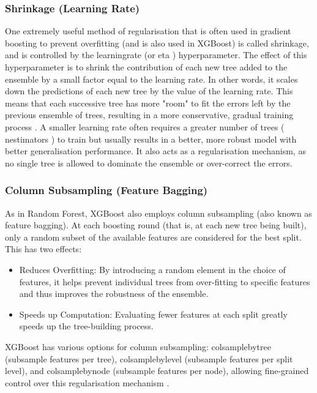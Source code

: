 \subsubsection{Shrinkage (Learning Rate)} 
One extremely useful method of regularisation that is often used in gradient boosting to prevent overfitting (and is also used in XGBoost) is called shrinkage, and is controlled by the learning\textunderscore rate (or eta ) hyperparameter. The effect of this hyperparameter is to shrink the contribution of each new tree added to the ensemble by a small factor equal to the learning rate. In other words, it scales down the predictions of each new tree by the value of the learning rate. This means that each successive tree has more "room" to fit the errors left by the previous ensemble of trees, resulting in a more conservative, gradual training process \parencite{aldhubaib2024network}. A smaller learning rate often requires a greater number of trees ( n\textunderscore estimators ) to train but usually results in a better, more robust model with better generalisation performance. It also acts as a regularisation mechanism, as no single tree is allowed to dominate the ensemble or over-correct the errors.

\subsubsection{Column Subsampling (Feature Bagging)} 
As in Random Forest, XGBoost also employs column subsampling (also known as feature bagging). At each boosting round (that is, at each new tree being built), only a random subset of the available features are considered for the best split. This has two effects: 
\begin{itemize}[noitemsep] 
\item Reduces Overfitting: By introducing a random element in the choice of features, it helps prevent individual trees from over-fitting to specific features and thus improves the robustness of the ensemble.
\item Speeds up Computation: Evaluating fewer features at each split greatly speeds up the tree-building process.
\end{itemize} 
XGBoost has various options for column subsampling: colsample\textunderscore bytree (subsample features per tree), colsample\textunderscore bylevel (subsample features per split level), and colsample\textunderscore bynode (subsample features per node), allowing fine-grained control over this regularisation mechanism \parencite{almutairi2025intrusion}.

